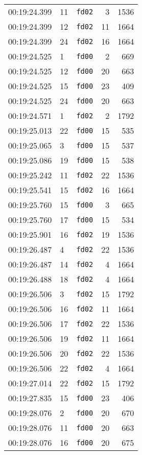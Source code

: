 \documentclass{article}
\begin{document}
\begin{longtable}{lllrr}
00:19:24.399 & 11 & \texttt{fd02} & 3 & 1536 \\
00:19:24.399 & 12 & \texttt{fd02} & 11 & 1664 \\
00:19:24.399 & 24 & \texttt{fd02} & 16 & 1664 \\
00:19:24.525 & 1 & \texttt{fd00} & 2 & 669 \\
00:19:24.525 & 12 & \texttt{fd00} & 20 & 663 \\
00:19:24.525 & 15 & \texttt{fd00} & 23 & 409 \\
00:19:24.525 & 24 & \texttt{fd00} & 20 & 663 \\
00:19:24.571 & 1 & \texttt{fd02} & 2 & 1792 \\
00:19:25.013 & 22 & \texttt{fd00} & 15 & 535 \\
00:19:25.065 & 3 & \texttt{fd00} & 15 & 537 \\
00:19:25.086 & 19 & \texttt{fd00} & 15 & 538 \\
00:19:25.242 & 11 & \texttt{fd02} & 22 & 1536 \\
00:19:25.541 & 15 & \texttt{fd02} & 16 & 1664 \\
00:19:25.760 & 15 & \texttt{fd00} & 3 & 665 \\
00:19:25.760 & 17 & \texttt{fd00} & 15 & 534 \\
00:19:25.901 & 16 & \texttt{fd02} & 19 & 1536 \\
00:19:26.487 & 4 & \texttt{fd02} & 22 & 1536 \\
00:19:26.487 & 14 & \texttt{fd02} & 4 & 1664 \\
00:19:26.488 & 18 & \texttt{fd02} & 4 & 1664 \\
00:19:26.506 & 3 & \texttt{fd02} & 15 & 1792 \\
00:19:26.506 & 16 & \texttt{fd02} & 11 & 1664 \\
00:19:26.506 & 17 & \texttt{fd02} & 22 & 1536 \\
00:19:26.506 & 19 & \texttt{fd02} & 11 & 1664 \\
00:19:26.506 & 20 & \texttt{fd02} & 22 & 1536 \\
00:19:26.506 & 22 & \texttt{fd02} & 4 & 1664 \\
00:19:27.014 & 22 & \texttt{fd02} & 15 & 1792 \\
00:19:27.835 & 15 & \texttt{fd00} & 23 & 406 \\
00:19:28.076 & 2 & \texttt{fd00} & 20 & 670 \\
00:19:28.076 & 11 & \texttt{fd00} & 20 & 663 \\
00:19:28.076 & 16 & \texttt{fd00} & 20 & 675 \\

\end{longtable}
\end{document}
